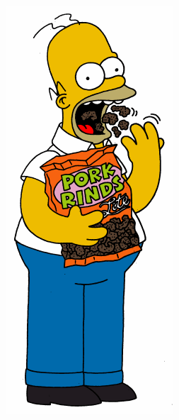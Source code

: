 \documentclass[journal]{IEEEtran}
\begin{document}
\begin{figure}[!htb]
\begin{subfigure}[b]{0.15\textwidth}
        \includegraphics[width=\textwidth]{homer001}

\end{subfigure}
\end{figure}
\end{document}
